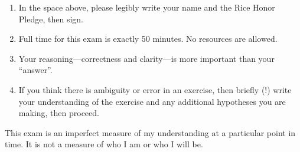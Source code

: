 \begin{enumerate}
\item In the space above, please legibly write your name and the Rice Honor Pledge, then sign.
\item Full time for this exam is exactly 50 minutes. No resources are allowed.
\item Your reasoning---correctness and clarity---is more important than your ``answer''.
\item If you think there is ambiguity or error in an exercise, then briefly (!) write your understanding of the exercise and any additional hypotheses you are making, then proceed.
\end{enumerate}
This exam is an imperfect measure of my understanding at a particular point in time. It is not a measure of who I am or who I will be.
